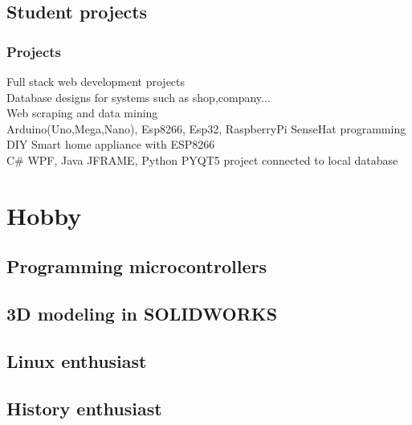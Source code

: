 \documentclass[10pt]{article}
\begin{document}
\subsection{\textbf{Student projects}}
\subsubsection{Projects}
Full stack web development projects\\
Database designs for systems such as shop,company...\\
Web scraping and data mining\\
Arduino(Uno,Mega,Nano), Esp8266, Esp32, RaspberryPi SenseHat programming\\
DIY Smart home appliance with ESP8266 \\
C{\#} WPF, Java JFRAME, Python PYQT5 project connected to local database\\
 


\section{Hobby}
\subsection{Programming microcontrollers}
\subsection{3D modeling in SOLIDWORKS}
\subsection{Linux enthusiast}
\subsection{History enthusiast}
\end{document}
